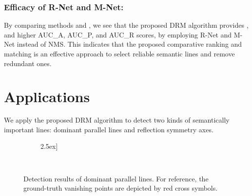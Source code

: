 \documentclass[runningheads]{llncs}
\newcommand{\RomNum}[1]{\MakeUppercase{\romannumeral #1}}
\begin{document}
\subsubsection{Efficacy of R-Net and M-Net:}
By comparing methods \RomNum{4} and \RomNum{5}, we see that the proposed DRM algorithm provides ,  and  higher AUC\_A, AUC\_P, and AUC\_R scores, by employing R-Net and M-Net instead of NMS. This indicates that the proposed comparative ranking and matching is an effective approach to select reliable semantic lines and remove redundant ones.

\section{Applications}
We apply the proposed DRM algorithm to detect two kinds of semantically important lines: dominant parallel lines and reflection symmetry axes.


\begin{figure*}[t]


    \begin{flushright}

    \,\!
    \,\!\!
    \,\!\!
    \,\!\!
    \,\!\!
    \-2.5ex]

    \!
    \,\!\!
    \,\!\!
    \,\!\!
    \,\!\!

    \caption
    {
        Detection results of dominant parallel lines. For reference, the ground-truth vanishing points are depicted by red cross symbols.
    }
    \label{fig:Qualitative Comparison VP Line}
    \end{flushright}
\end{figure*}
\end{document}
